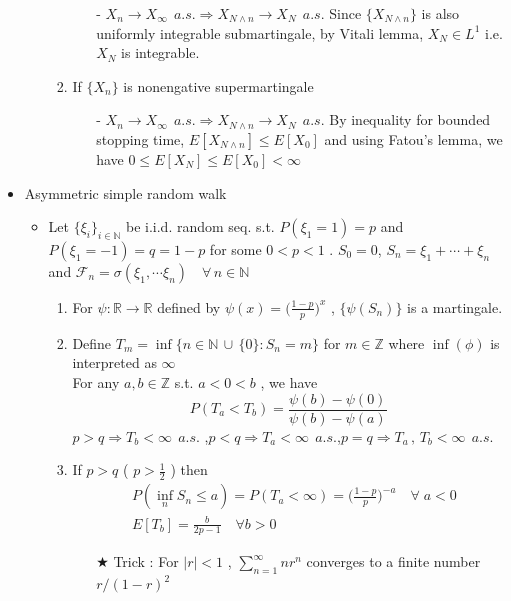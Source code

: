 \documentclass[12pt, A4]{article}
\newcommand{\trick}{$\bigstar$}
\newcommand{\N}{\mathbb{N}}
\newcommand{\R}{\mathbb{R}}
\newcommand{\F}{\mathcal{F}}
\newcommand{\union}{\,\cup\,}
\newcommand{\foranyn}{\quad \forall \, n\in \N}
\begin{document}
\begin{itemize}
\begin{itemize}
\begin{enumerate}
			\begin{itemize}
				\item[-] $X_n\rightarrow X_\infty\;\,a.s.\Rightarrow X_{N\wedge n}\rightarrow X_N\;\,a.s.$ \;Since $\{X_{N\wedge n}\}$ is also uniformly integrable submartingale, by Vitali lemma, $X_N\in L^1$ i.e. $X_N$ is integrable. 
			\end{itemize}
			\item If $\{X_n\}$ is nonengative supermartingale
			\begin{itemize}
				\item[-] $X_n\rightarrow X_\infty\;\,a.s.\Rightarrow X_{N\wedge n}\rightarrow X_N\;\,a.s.$ By inequality for bounded stopping time, $E[X_{N\wedge n}]\leq E[X_0]$ and using Fatou's lemma, we have $0\leq E[X_N]\leq E[X_0]<\infty$
			\end{itemize}
		\end{enumerate}
	\end{itemize}
	\item Asymmetric simple random walk
	\begin{itemize}
		\item Let $\{\xi_i\}_{i\in \N}$ be i.i.d. random seq. s.t. $P(\xi_1=1)=p$ and $P(\xi_1=-1)=q=1-p$ for some $0<p<1$ . $S_0=0$, $S_n=\xi_1+\cdots+\xi_n$ and $\F_n=\sigma(\xi_1, \cdots \xi_n)\foranyn$
		\begin{enumerate}
			\item For $\psi:\R \rightarrow \R$ defined by $\psi(x)=\big(\frac{1-p}{p}\big)^x$ , $\{\psi(S_n)\}$ is a martingale.
			\item Define $T_{m}=\inf\{n\in \N\union\{0\} :S_n=m \}$ for $m\in \mathbb{Z}$ where $\inf(\phi)$ is interpreted as $\infty$ \\For any $ a,b\in \mathbb{Z}$ s.t. $a<0<b$ , we have $$P(T_a<T_b)=\frac{\psi(b)-\psi(0)}{\psi(b)-\psi(a)} $$
			$p>q\Rightarrow T_b<\infty\;\,a.s.$ \quad,\quad $p<q\Rightarrow T_a<\infty\;\,a.s.$\quad,\quad   $p=q\Rightarrow T_a\, ,\, T_b<\infty\;\,a.s.$
			\item If $p>q$ ( $p>\frac{1}{2}$ ) then 
			\begin{align*}
				&P(\inf_n S_n\leq a)=P(T_a<\infty)=\big(\frac{1-p}{p}\big)^{-a} \quad \forall \; a<0 \\ &E[T_b]=\frac{b}{2p-1}\quad \forall b>0
			\end{align*}
			\begin{itemize}
				\item[\trick] Trick : For $|r|<1$ , $\sum_{n=1}^\infty nr^n$ converges to a finite number $r/(1-r)^2$ 

\end{itemize}
\end{enumerate}
\end{itemize}
\end{itemize}
\end{document}
